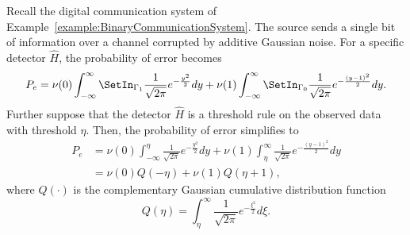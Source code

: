 \begin{example} \label{example:BinaryCommunicationSystemII}
Recall the digital communication system of Example~\ref{example:BinaryCommunicationSystem}.
The source sends a single bit of information over a channel corrupted by additive Gaussian noise.
For a specific detector $\hat{H}$, the probability of error becomes
\begin{equation*}
P_e
=  \nu(0) \int_{-\infty}^{\infty} \SetIn_{ \Gamma_1 }
\frac{1}{\sqrt{2 \pi}} e^{- \frac{y^2}{2}} dy
+ \nu(1) \int_{-\infty}^{\infty} \SetIn_{ \Gamma_0 }
\frac{1}{\sqrt{2 \pi}} e^{- \frac{(y-1)^2}{2}} dy .
\end{equation*}
Further suppose that the detector $\hat{H}$ is a threshold rule on the observed data with threshold $\eta$.
Then, the probability of error simplifies to
\begin{equation*}
\begin{split}
P_e
&=  \nu(0) \int_{-\infty}^{\eta} \frac{1}{\sqrt{2 \pi}} e^{- \frac{y^2}{2}} dy
+ \nu(1) \int_{\eta}^{\infty} \frac{1}{\sqrt{2 \pi}} e^{- \frac{(y-1)^2}{2}} dy \\
&= \nu(0) Q (-\eta) + \nu(1) Q (\eta + 1),
\end{split}
\end{equation*}
where $Q(\cdot)$ is the complementary Gaussian cumulative distribution function
\begin{equation}
Q (\eta) = \int_{\eta}^{\infty} \frac{1}{\sqrt{2 \pi}}
e^{- \frac{\xi^2}{2}} d\xi.
\end{equation}
\end{example}

